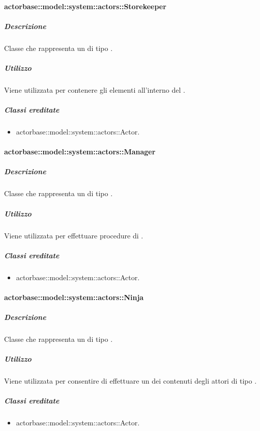 \documentclass{scalatekids-article}
\begin{document}
\paragraph{actorbase::model::system::actors::Storekeeper}

\subparagraph{Descrizione}

Classe che rappresenta un  di tipo .

\subparagraph{Utilizzo}

Viene utilizzata per contenere gli elementi all'interno del .

\subparagraph{Classi ereditate}

\begin{itemize}
\item actorbase::model::system::actors::Actor.
\end{itemize}

\paragraph{actorbase::model::system::actors::Manager}

\subparagraph{Descrizione}

Classe che rappresenta un  di tipo .

\subparagraph{Utilizzo}

Viene utilizzata per effettuare procedure di .

\subparagraph{Classi ereditate}

\begin{itemize}
\item actorbase::model::system::actors::Actor.
\end{itemize}

\paragraph{actorbase::model::system::actors::Ninja}

\subparagraph{Descrizione}

Classe che rappresenta un  di tipo .

\subparagraph{Utilizzo}

Viene utilizzata per consentire di effettuare un  dei contenuti
degli attori di tipo .

\subparagraph{Classi ereditate}

\begin{itemize}
\item actorbase::model::system::actors::Actor.
\end{itemize}
\end{document}

